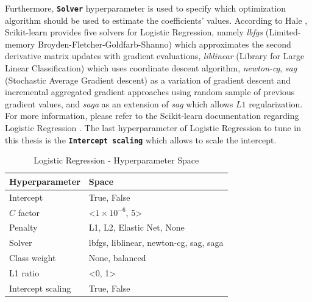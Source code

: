 Furthermore, \textbf{\texttt{Solver}} hyperparameter is used to specify which optimization algorithm should be used to estimate the coefficients' values.
According to Hale \citep{hale2019dont}, Scikit-learn provides five solvers for Logistic Regression, namely \textit{lbfgs} (Limited-memory Broyden-Fletcher-Goldfarb-Shanno) which approximates the second derivative matrix updates with gradient evaluations, \textit{liblinear} (Library for Large Linear Classification) which uses coordinate descent algorithm, \textit{newton-cg},
\textit{sag} (Stochastic Average Gradient descent) as a variation of gradient descent and incremental aggregated gradient approaches using random sample of previous gradient values, and \textit{saga} as an extension of \textit{sag} which allows $L1$ regularization.
For more information, please refer to the Scikit-learn documentation regarding Logistic Regression \citep{scikit-lr}.
The last hyperparameter of Logistic Regression to tune in this thesis is the \textbf{\texttt{Intercept scaling}} which allows to scale the intercept.

\begin{table}[H]
\small
\setlength{\tabcolsep}{8pt}
\renewcommand{\arraystretch}{1.3}
\centering
    \caption[Logistic Regression - Hyperparameter Space]{Logistic Regression - Hyperparameter Space}\label{tab:lrspace}
    \begin{tabular}{ll}
\toprule
\textbf{Hyperparameter} & \textbf{Space}\\
\midrule
\hline
Intercept & True, False \\
$C$ factor & <$1\times10^{-6}$, 5>\\
Penalty & L1, L2, Elastic Net, None \\
Solver & lbfgs, liblinear, newton-cg, sag, saga \\
Class weight & None, balanced \\
L1 ratio & <0, 1> \\
Intercept scaling & True, False  \\
\hline
\bottomrule
\end{tabular}
\vspace{0.7em}

\vspace{-1em}
\end{table}


